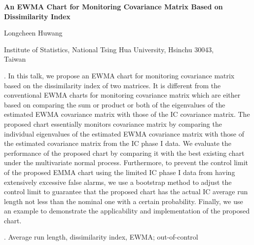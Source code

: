 \documentclass[12pt]{article}
\begin{document}


{\LARGE\bf An EWMA Chart for Monitoring Covariance Matrix Based on Dissimilarity Index}


\vspace{1.0cm}

Longcheen Huwang

\begin{description}

\item Institute of Statistics,
National Tsing Hua University,
Hsinchu 30043,\\ Taiwan

\end{description}



\vspace{0.75cm}

. In this talk, we propose an EWMA chart for monitoring covariance matrix based on the dissimilarity index of two matrices. It is different from the conventional EWMA charts for monitoring covariance matrix which are either based on comparing the sum or product or both of the eigenvalues of the estimated EWMA covariance matrix with those of the IC covariance matrix. The proposed chart essentially monitors covariance matrix by comparing the individual eigenvalues of the estimated EWMA covariance matrix with those of the estimated covariance matrix from the IC phase I data.  We evaluate the performance of the proposed chart by comparing it with the best existing chart under the multivariate normal process. Furthermore, to prevent the control limit of the proposed EMMA chart using the limited IC phase I data from having extensively excessive false alarms, we use a bootstrap method to adjust the control limit to guarantee that the proposed chart has the actual IC average run length not less than the nominal one with a certain probability. Finally, we use an example to demonstrate the applicability and implementation of the proposed chart. 

\vskip 2mm

. Average run length, dissimilarity index, EWMA; out-of-control
\end{document}
